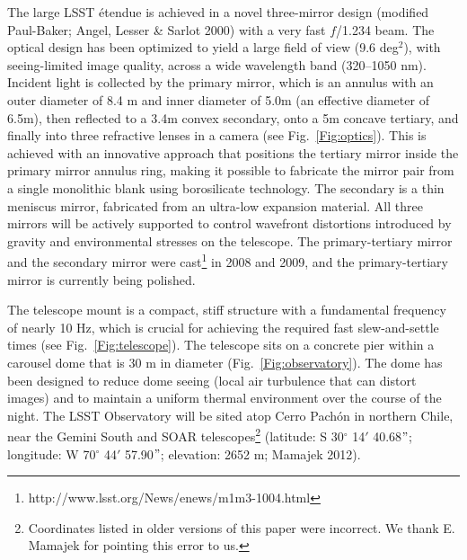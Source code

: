 \documentclass{emulateapj}
\begin{document}
The large LSST \'etendue is achieved in a novel three-mirror design (modified
Paul-Baker; Angel, Lesser \& Sarlot 2000) with a very fast $f$/1.234 beam. The optical 
design has been optimized to yield a large field of view (9.6 deg$^2$), 
with seeing-limited image quality, across a wide wavelength band (320--1050
nm). Incident light is collected by the primary mirror, which is an annulus
with an outer diameter of 8.4 m and inner diameter of 5.0m (an effective diameter of 
6.5m), then reflected to a 3.4m convex secondary, onto a 5m concave tertiary, and finally 
into three refractive lenses in a camera (see Fig.~\ref{Fig:optics}). This is achieved 
with an innovative approach that positions the tertiary mirror inside the primary 
mirror annulus ring, making it possible to fabricate the mirror pair from a 
single monolithic blank using borosilicate technology. The secondary is 
a thin meniscus mirror, fabricated from an ultra-low expansion material. All 
three mirrors will be actively supported to control wavefront distortions 
introduced by gravity and environmental stresses on the telescope. 
The primary-tertiary mirror and the secondary mirror were 
cast\footnote{http://www.lsst.org/News/enews/m1m3-1004.html}  in 2008 and 2009,
and the primary-tertiary mirror is currently being polished. 

The telescope mount is a compact, stiff structure with a fundamental frequency of 
nearly 10 Hz, which is crucial for achieving the required fast slew-and-settle times
(see Fig.~\ref{Fig:telescope}). The telescope sits on a concrete pier within a 
carousel dome that is 30 m in diameter (Fig.~\ref{Fig:observatory}). The dome has 
been designed to reduce dome seeing (local air turbulence that can distort images) 
and to maintain a uniform thermal environment over the course of the night. 
The LSST Observatory will be sited atop Cerro Pach\'{o}n in northern Chile,
near the Gemini South and SOAR telescopes\footnote{Coordinates listed in older versions 
of this paper were incorrect. We thank E. Mamajek for pointing this error to us.} 
(latitude: S 30$^\circ$ 14$'$ 40.68$"$; longitude: W 70$^\circ$ 44$'$ 57.90$"$; elevation: 2652 m; 
Mamajek 2012).
\end{document}
